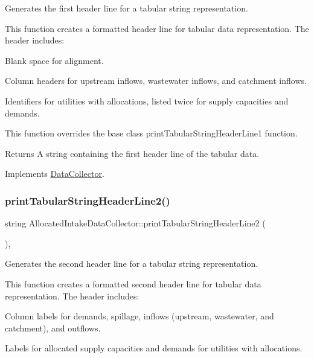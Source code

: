 Generates the first header line for a tabular string representation. 

This function creates a formatted header line for tabular data representation. The header includes\+:
\begin{DoxyItemize}
\item Blank space for alignment.
\item Column headers for upstream inflows, wastewater inflows, and catchment inflows.
\item Identifiers for utilities with allocations, listed twice for supply capacities and demands.
\end{DoxyItemize}

This function overrides the base class {\ttfamily print\+Tabular\+String\+Header\+Line1} function.

\begin{DoxyReturn}{Returns}
A string containing the first header line of the tabular data. 
\end{DoxyReturn}


Implements \mbox{\hyperlink{classDataCollector_a91619cfa9e9b8cefd2f7c20d5718b41e}{Data\+Collector}}.

\mbox{\label{classAllocatedIntakeDataCollector_aeee44be0f105fb0d5feac72f4c80f7ff}} 
\subsubsection{\texorpdfstring{print\+Tabular\+String\+Header\+Line2()}{printTabularStringHeaderLine2()}}
{\footnotesize\ttfamily string Allocated\+Intake\+Data\+Collector\+::print\+Tabular\+String\+Header\+Line2 (\begin{DoxyParamCaption}{ }\end{DoxyParamCaption})\hspace{0.3cm}{\ttfamily [override]}, {\ttfamily [virtual]}}



Generates the second header line for a tabular string representation. 

This function creates a formatted second header line for tabular data representation. The header includes\+:
\begin{DoxyItemize}
\item Column labels for demands, spillage, inflows (upstream, wastewater, and catchment), and outflows.
\item Labels for allocated supply capacities and demands for utilities with allocations.
\end{DoxyItemize}

